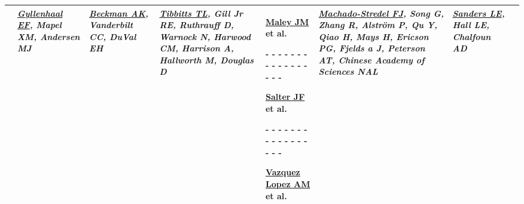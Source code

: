 \begin{tabular}{|x{0.8cm}|x{2.65cm}|x{2.65cm}|a{2.65cm}|y{2.65cm}|x{2.65cm}|x{2.65cm}|@{}m{0pt}@{}}
& \par \vspace{8pt} \textit{\underline{Gyllenhaal EF}, Mapel XM, Andersen MJ} &  \par \vspace{8pt} \textit{\underline{Beckman AK}, Vanderbilt CC, DuVal EH} &  \par \vspace{8pt} \textit{\underline{Tibbitts TL}, Gill Jr RE, Ruthrauff D, Warnock N, Harwood CM, Harrison A, Hallworth M, Douglas D} & \scriptsize {} \par \tiny \underline{Maley JM} et al.\par - - - - - - - - - - - - - - - - - \par \vspace{2pt} \scriptsize {} \par \tiny \underline{Salter JF} et al.\par - - - - - - - - - - - - - - - - - \par \vspace{2pt} \scriptsize {} \par \tiny \underline{Vazquez Lopez AM} et al. &  \par \vspace{8pt} \textit{\underline{Machado-Stredel FJ}, Song G, Zhang R, Alstr\"{o}m P, Qu Y, Qiao H, Mays H, Ericson PG, Fjelds
{a} J, Peterson AT, Chinese Academy of Sciences NAL} &  \par \vspace{8pt} \textit{\underline{Sanders LE}, Hall LE, Chalfoun AD}&\\[25ex]
\hline

\end{tabular}
